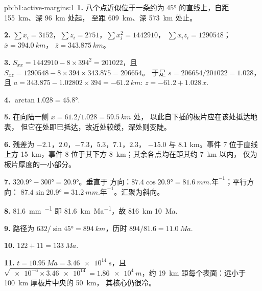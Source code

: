 \begin{solution}{pb:b1:active-margins:1}
\textbf{1.} 八个点近似位于一条约为
\ang{45} 的直线上，自距 \qty{155}{km}、深 \qty{96}{km} 处起，
至距 \qty{609}{km}、深 \qty{573}{km} 处止。

\textbf{2.} $\sum x_i = 3152$，$\sum z_i = 2751$，$\sum x_i^2 = \num{1442910}$，
$\sum x_i z_i = \num{1290548}$；$\bar x = \qty{394.0}{km}$，
$\bar z = \qty{343.875}{km}$。

\textbf{3.} $S_{xx} = 1442910 - 8\times394^2 = \num{201022}$，且
$S_{xz} = 1290548 - 8\times394\times343.875 = \num{206654}$。
于是 $s = 206654/201022 = 1.028$，且 $a = 343.875 - 1.02802\times394 =
\qty{-61.2}{km}$: $z = -61.2 + 1.028\,x$.

\textbf{4.} $\arctan1.028 = \ang{45.8}$.

\textbf{5.} 在向陆一侧 $x = 61.2/1.028 = \qty{59.5}{km}$ 处，
以此自下插的板片应在该处抵达地表，
但它在处即已抵达，故近处较缓，深处则变陡。

\textbf{6.} 残差为 $-2.1$，$2.0$，$-7.3$，$5.3$，$7.1$，$2.3$，
$-15.0$ 与 $8.1$ \unit{km}。事件 7 位于直线上方 \qty{15}{km}，事件 8
位于其下方 \qty{8}{km}；其余各点均在距其约 \qty{7}{km} 以内，
仅为板片厚度的一小部分。

\textbf{7.} $\ang{320.9} - \ang{300} = \ang{20.9}$。垂直于
方向：$87.4\cos\ang{20.9} = \qty{81.6}{mm.\text{年}^{-1}}$；平行方向：
$87.4\sin\ang{20.9} = \qty{31.2}{mm.\text{年}^{-1}}$。汇聚为斜向。

\textbf{8.} \qty{81.6}{mm.^{-1}} 即 \qty{81.6}{km.Ma^{-1}}，故 \qty{816}{km}
\qty{10}{Ma}.

\textbf{9.} 路径为 $632/\sin\ang{45} = \qty{894}{km}$，历时
$894/81.6 = \qty{11.0}{Ma}$.

\textbf{10.} $122 + 11 = \qty{133}{Ma}$.

\textbf{11.} $t = \qty{10.95}{Ma} = \qty{3.46e14}{s}$，且
$\sqrt{\num{e-6}\times\num{3.46e14}} = \qty{1.86e4}{m}$，约 \qty{19}{km}
距每个表面：远小于 \qty{100}{km} 厚板片中央的 \qty{50}{km}，
其核心仍很冷。


\end{solution}
